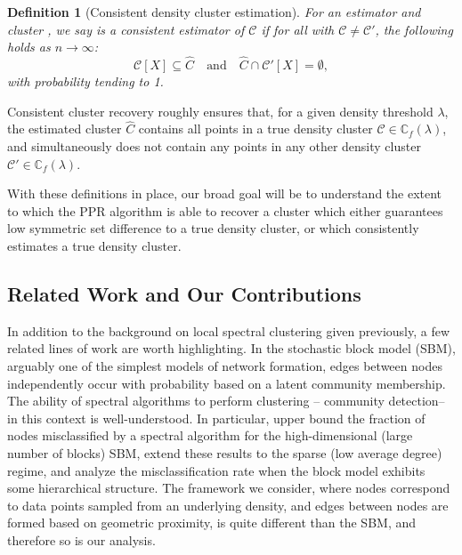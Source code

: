 \documentclass[11pt,twoside]{article}
\newtheorem{definition}{Definition}
\newcommand{\1}{\mathbf{1}}
\newcommand{\Xbf}{X}             %
\newcommand{\Cbb}{\mathbb{C}}
\newcommand{\Cset}{\mathcal{C}}
\newcommand{\Cest}{\widehat{C}}
\begin{document}
\begin{definition}[Consistent density cluster estimation]
  \label{def: consistent_density_cluster_estimation}
  For an estimator \smash{$\Cest \subseteq \Xbf$} and cluster 
  \smash{$\Cset \in \Cbb_f(\lambda)$}, we say \smash{$\Cest$} is a consistent 
  estimator of $\Cset$ if for all \smash{$\Cset' \in \Cbb_f(\lambda)$} with
  $\Cset \not= \Cset'$, the following holds as $n \to \infty$: 
  \begin{equation}
    \label{eqn: consistent_density_cluster_recovery}
    \Cset[\Xbf] \subseteq \Cest \quad \text{and} \quad
    \Cest \cap \Cset'[\Xbf] = \emptyset,
  \end{equation}
  with probability tending to 1.
\end{definition}
\noindent Consistent cluster recovery roughly ensures that, for a given density threshold $\lambda$, the estimated cluster $\Cest$ contains all
points in a true
density cluster $\Cset \in \Cbb_f(\lambda)$, and simultaneously does not contain any points in any other density cluster $\Cset' \in \Cbb_f(\lambda)$. 

With these definitions in place, our broad goal will be to understand the extent to which the PPR algorithm is able to
recover a cluster which either guarantees low symmetric set difference to a true density cluster, or which consistently estimates
a true density cluster.



\subsection{Related Work and Our Contributions}
In addition to the background on local spectral
clustering given previously, a few related lines of work are worth
highlighting. In the stochastic block model (SBM), arguably one of the simplest models of network formation, edges between nodes independently occur with probability based on a latent community membership. The ability of spectral algorithms to perform clustering -- community detection-- in this context is well-understood. In particular, \citet{rohe2011} upper bound the fraction of nodes misclassified by a spectral algorithm for the high-dimensional (large number of blocks) SBM,  \citet{lei2015} extend these results to the sparse (low average degree) regime, and \citet{balakrishnan2011} analyze the misclassification rate when the block model exhibits some hierarchical structure. The framework we consider, where nodes correspond to data points sampled from an underlying density, and edges between nodes are formed based on geometric proximity, is quite different than the SBM, and therefore so is our analysis.
\end{document}
